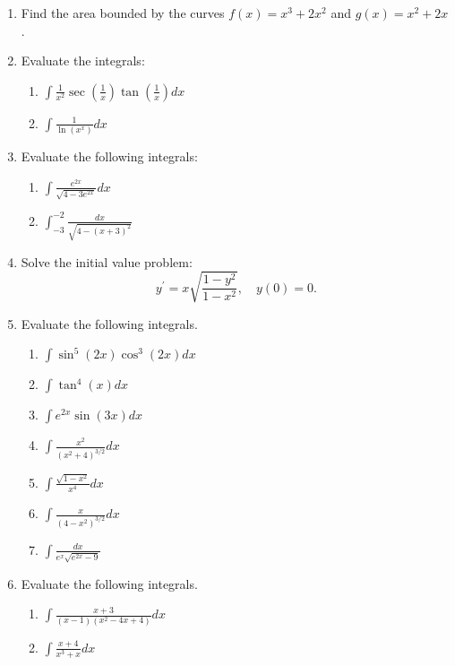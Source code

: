\documentclass[12pt]{article}
\begin{document}
\begin{enumerate}
\item 
Find the area bounded by the curves $f(x)=x^3+2x^2$ and 
$g(x)=x^2+2x$.
\medskip

\item 
Evaluate the integrals:
\begin{enumerate}
\item $\int {\frac{1}{x^2}} \sec \left ( {\frac{1}{x}} \right ) \tan 
\left ( {\frac{1}{x}} \right ) dx$
\medskip

\item $\int {\frac{1}{\ln(x^x)}} dx$
\medskip

\end{enumerate}

\item 
Evaluate the following integrals: 
\begin{enumerate}
\item $\int {\frac{e^{2x}}{\sqrt{4-3e^{2x}}}} dx$
\medskip

\item $\int_{-3}^{-2} {\frac{dx}{\sqrt{4 - (x+3)^2}}}$
\medskip

\end{enumerate}

\item 
Solve the initial value problem:
$$y^{\prime} = x \sqrt{ {\frac{1-y^2}{1-x^2}} }, \quad y(0)=0.$$
\medskip

\item 
Evaluate the following integrals.
\medskip
\begin{enumerate}
\item $\int \sin^5(2x) \cos^3 (2x) dx$
\medskip
\item $\int \tan^4(x) dx$ 
\medskip
\item $\int e^{2x} \sin(3x) dx$
\medskip
\item $\int {\frac{x^2}{(x^2+4)^{3/2}}} dx$ 
\medskip
\item $\int {\frac{\sqrt{1-x^2}}{x^4}} dx$
\medskip
\item $\int {\frac{x}{(4-x^2)^{3/2}}} dx$ 
\medskip
\item $\int {\frac{dx}{e^x \sqrt{e^{2x} - 9}}}$
\medskip
\end{enumerate}

\item 
Evaluate the following integrals.
\medskip
\begin{enumerate}
\item $\int {\frac{x+3}{(x-1)(x^2-4x+4)}} dx$
\medskip
\item $\int {\frac{x+4}{x^3+x}} dx$ 
\medskip
\end{enumerate}


\end{enumerate}
\end{document}
